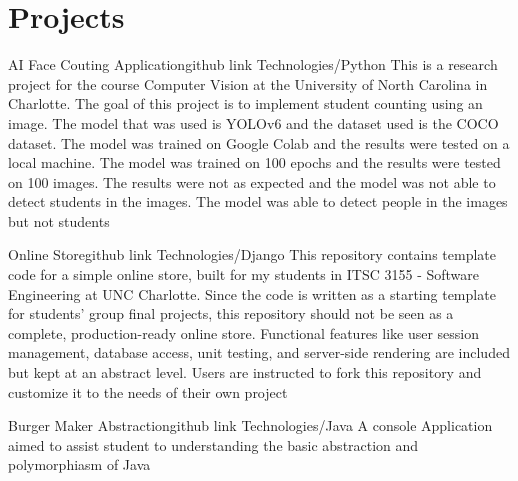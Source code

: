\section{Projects}
\resumeSubHeadingListStart

    \resumeProjectHeading
        {AI Face Couting Application}{github link}
        {Technologies/Python}
        {This is a research project for the course Computer Vision at the University of North Carolina in Charlotte. The goal of this project is to implement student counting using an image. The model that was used is YOLOv6 and the dataset used is the COCO dataset. The model was trained on Google Colab and the results were tested on a local machine. The model was trained on 100 epochs and the results were tested on 100 images. The results were not as expected and the model was not able to detect students in the images. The model was able to detect people in the images but not students}

    \resumeProjectHeading
        {Online Store}{github link}
        {Technologies/Django}
        {This repository contains template code for a simple online store, built for my students in ITSC 3155 - Software Engineering at UNC Charlotte. Since the code is written as a starting template for students' group final projects, this repository should not be seen as a complete, production-ready online store. Functional features like user session management, database access, unit testing, and server-side rendering are included but kept at an abstract level. Users are instructed to fork this repository and customize it to the needs of their own project}

    \resumeProjectHeading
        {Burger Maker Abstraction}{github link}
        {Technologies/Java}
        {A console Application aimed to assist student to understanding the basic abstraction and polymorphiasm of Java}


\resumeSubHeadingListEnd
